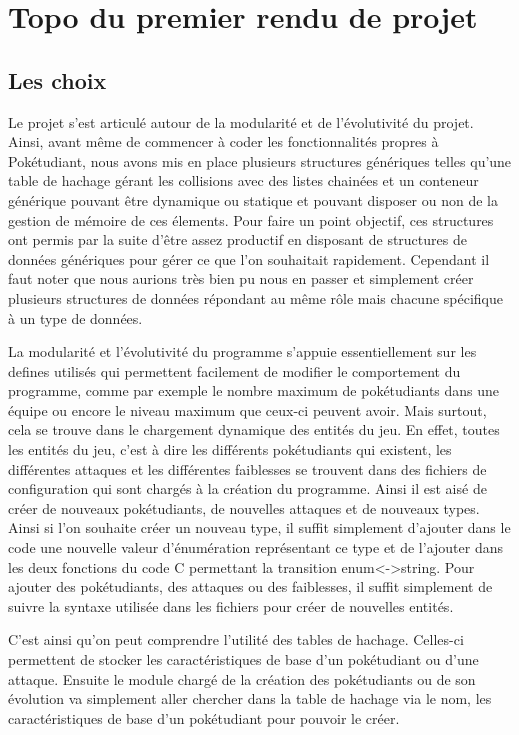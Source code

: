 \documentclass[10pt,a4paper,twocolumn]{report}
\begin{document}
\chapter{Topo du premier rendu de projet}

\section{Les choix}

Le projet s'est articulé autour de la modularité et de l'évolutivité du projet.
Ainsi, avant même de commencer à coder les fonctionnalités propres à Pokétudiant, nous avons
mis en place plusieurs structures génériques telles qu'une table de hachage gérant les collisions avec des listes chainées et un conteneur générique pouvant être dynamique ou statique et pouvant disposer ou non de la gestion de mémoire de ces élements.
Pour faire un point objectif, ces structures ont permis par la suite d'être assez productif en disposant de structures de données génériques pour gérer ce que l'on souhaitait rapidement. Cependant il faut noter que nous aurions très bien pu nous en passer et simplement créer plusieurs structures de données répondant au même rôle mais chacune spécifique à un type de données.

La modularité et l'évolutivité du programme s'appuie essentiellement sur les defines utilisés qui permettent facilement de modifier le comportement du programme, comme par exemple le nombre maximum de pokétudiants dans une équipe ou encore le niveau maximum que ceux-ci peuvent avoir.
Mais surtout, cela se trouve dans le chargement dynamique des entités du jeu.
En effet, toutes les entités du jeu, c'est à dire les différents pokétudiants qui existent, les différentes attaques et les différentes faiblesses se trouvent dans des fichiers de configuration qui sont chargés à la création du programme. Ainsi il est aisé de créer de nouveaux pokétudiants, de nouvelles attaques et de nouveaux types.
Ainsi si l'on souhaite créer un nouveau type, il suffit simplement d'ajouter dans le code une nouvelle valeur d'énumération représentant ce type et de l'ajouter dans les deux fonctions du code C permettant la transition enum<->string.
Pour ajouter des pokétudiants, des attaques ou des faiblesses, il suffit simplement de suivre la syntaxe utilisée dans les fichiers pour créer de nouvelles entités.

C'est ainsi qu'on peut comprendre l'utilité des tables de hachage. Celles-ci permettent de stocker les caractéristiques de base d'un pokétudiant ou d'une attaque. Ensuite le module chargé de la création des pokétudiants ou de son évolution va simplement aller chercher dans la table de hachage via le nom, les caractéristiques de base d'un pokétudiant pour pouvoir le créer.
\end{document}
